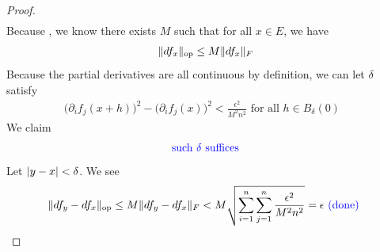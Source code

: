 \documentclass{report}
\begin{document}
\begin{proof}
\begin{align*}
\end{align*}
Because , we know there exists $M$ such that for all $x\in E$, we have 
\begin{align*}
\| df_x \|_\text{op}\leq  M\| df_x \|_F
\end{align*}
Because the partial derivatives are all continuous by definition, we can let $\delta$ satisfy 
\begin{align*}
  \big(\partial_i f_j(x+h)\big)^2-\big(\partial_i f_j(x)\big)^2< \frac{\epsilon^2 }{M^2n^2}\text{ for all $h \in B_\delta (0)$ }
\end{align*}
We claim 
\begin{align*}
\textcolor{blue}{\text{ such }\delta\text{ suffices }}
\end{align*}
Let $\left|y-x\right|<\delta$. We see 
\begin{align*}
\| df_y-df_x \|_\text{op}\leq M\| df_y -df_x \|_F< M \sqrt{\sum_{i=1}^n \sum_{j=1}^n\frac{\epsilon^2 }{M^2n^2}}=\epsilon \textcolor{blue}{\text{ (done) }}
\end{align*}












\end{proof}
\end{document}
